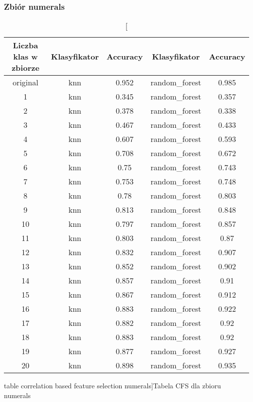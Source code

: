 \documentclass{classrep}
\begin{document}
{{            \subsubsection{Zbiór numerals} {
            \begin{table}[!htbp]
\centering
\begin{tabular}{|c|c|c|c|c|}
\hline
Liczba klas w zbiorze & Klasyfikator & Accuracy & Klasyfikator & Accuracy \\ \hline
original & knn & 0.952 & random\_forest & 0.985 \\ \hline
1 & knn & 0.345 & random\_forest & 0.357 \\ \hline
2 & knn & 0.378 & random\_forest & 0.338 \\ \hline
3 & knn & 0.467 & random\_forest & 0.433 \\ \hline
4 & knn & 0.607 & random\_forest & 0.593 \\ \hline
5 & knn & 0.708 & random\_forest & 0.672 \\ \hline
6 & knn & 0.75 & random\_forest & 0.743 \\ \hline
7 & knn & 0.753 & random\_forest & 0.748 \\ \hline
8 & knn & 0.78 & random\_forest & 0.803 \\ \hline
9 & knn & 0.813 & random\_forest & 0.848 \\ \hline
10 & knn & 0.797 & random\_forest & 0.857 \\ \hline
11 & knn & 0.803 & random\_forest & 0.87 \\ \hline
12 & knn & 0.832 & random\_forest & 0.907 \\ \hline
13 & knn & 0.852 & random\_forest & 0.902 \\ \hline
14 & knn & 0.857 & random\_forest & 0.91 \\ \hline
15 & knn & 0.867 & random\_forest & 0.912 \\ \hline
16 & knn & 0.883 & random\_forest & 0.922 \\ \hline
17 & knn & 0.882 & random\_forest & 0.92 \\ \hline
18 & knn & 0.883 & random\_forest & 0.92 \\ \hline
19 & knn & 0.877 & random\_forest & 0.927 \\ \hline
20 & knn & 0.898 & random\_forest & 0.935 \\ \hline
\end{tabular}
\caption
[table correlation based feature selection numerals]{Tabela CFS dla zbioru numerals}
\label{table_correlation_based_feature_selection_numerals}
\end{table}
\FloatBarrier
            }
}}
\end{document}
